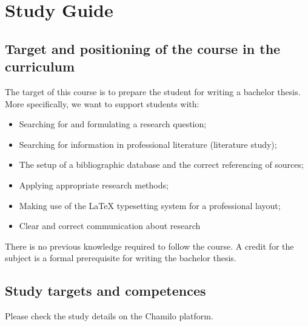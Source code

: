 \chapter*{Study Guide}
\label{ch:studyguide}

\section{Target and positioning of the course in the curriculum}
\label{sec:targetandplace}

The target of this course is to prepare the student for writing a bachelor thesis. More specifically, we want to support students with:

\begin{itemize}
  \item Searching for and formulating a research question;
  \item Searching for information in professional literature (literature study);
  \item The setup of a bibliographic database and the correct referencing of sources; 
  \item Applying appropriate research methods;
  \item Making use of the {\LaTeX} typesetting system for a professional layout;
  \item Clear and correct communication about research
\end{itemize}

There is no previous knowledge required to follow the course. A credit for the subject is a formal prerequisite for writing the bachelor thesis. 

\section{Study targets and competences}
\label{sec:studytargets}

Please check the study details on the Chamilo platform.


